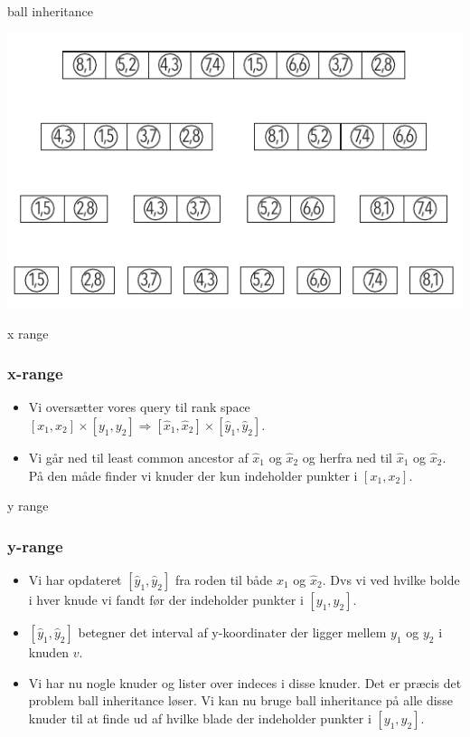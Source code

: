 \documentclass[pdf]{beamer}
\begin{document}
\begin{frame}{ball inheritance}
  \begin{center}
    \includegraphics[scale=1.0]{pictures/bolde_med_to_tal.pdf}
  \end{center}
\end{frame}


\begin{frame}{x range}
  \frametitle{x-range}
  \begin{itemize}
    \item Vi oversætter vores query til rank space $[x_1, x_2] \times [y_1, y_2] \Rightarrow [\hat{x}_1, \hat{x}_2] \times [\hat{y}_1, \hat{y}_2]$.
      \pause

    \item Vi går ned til least common ancestor af $\hat{x}_1$ og $\hat{x}_2$ og herfra ned til $\hat{x}_1$ og $\hat{x}_2$. På den måde finder vi knuder der kun indeholder punkter i $[x_1, x_2]$.
  \end{itemize}
\end{frame}

\begin{frame}{y range}
  \frametitle{y-range}
  \begin{itemize}
    \item Vi har opdateret $[\hat{y}_1, \hat{y}_2]$ fra roden til både $\hat{x}_1$ og $\hat{x}_2$. Dvs vi ved hvilke bolde i hver knude vi fandt før der indeholder punkter i $[y_1, y_2]$.
      \pause
    \item $[\hat{y}_1, \hat{y}_2]$ betegner det interval af y-koordinater der ligger mellem $y_1$ og $y_2$ i knuden $v$.
      \pause
    \item  Vi har nu nogle knuder og lister over indeces i disse knuder. Det er præcis det problem ball inheritance løser. Vi kan nu bruge ball inheritance på alle disse knuder til at finde ud af hvilke blade der indeholder punkter i $[y_1, y_2]$.
  \end{itemize}
\end{frame}
\end{document}
